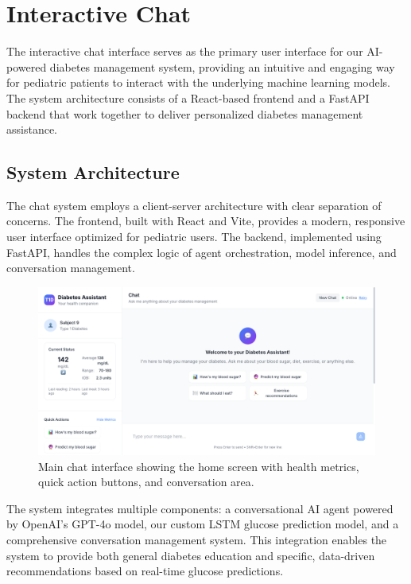 \documentclass[acmsmall]{acmart}
\begin{document}
\section{Interactive Chat}

The interactive chat interface serves as the primary user interface for our AI-powered diabetes management system, providing an intuitive and engaging way for pediatric patients to interact with the underlying machine learning models. The system architecture consists of a React-based frontend and a FastAPI backend that work together to deliver personalized diabetes management assistance.

\subsection{System Architecture}

The chat system employs a client-server architecture with clear separation of concerns. The frontend, built with React and Vite, provides a modern, responsive user interface optimized for pediatric users. The backend, implemented using FastAPI, handles the complex logic of agent orchestration, model inference, and conversation management.

\begin{figure}[h]
  \centering
  \includegraphics[width=\linewidth]{images/Home.png}
  \caption{Main chat interface showing the home screen with health metrics, quick action buttons, and conversation area.}
  \label{fig:home}
\end{figure}

The system integrates multiple components: a conversational AI agent powered by OpenAI's GPT-4o model, our custom LSTM glucose prediction model, and a comprehensive conversation management system. This integration enables the system to provide both general diabetes education and specific, data-driven recommendations based on real-time glucose predictions.
\end{document}
